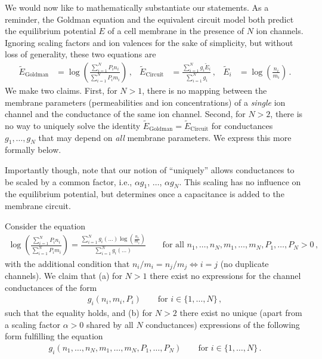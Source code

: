 We would now like to mathematically substantiate our statements.
As a reminder, the Goldman equation and the equivalent circuit model both predict the equilibrium potential $E$ of a cell membrane in the presence of $N$ ion channels.
Ignoring scaling factors and ion valences for the sake of simplicity, but without loss of generality, these two equations are
\begin{align*}
	\tilde E_\mathrm{Goldman} &= \log \left( \frac{\sum_{i=1}^N P_i n_i}{\sum_{i = 1}^N P_i m_i} \right) \,,&
	\tilde E_\mathrm{Circuit} &= \frac{\sum_{i = 1}^N g_i \tilde E_i }{\sum_{i = 1}^N g_i} \,, &
	\tilde E_i &= \log \left( \frac{n_i}{m_i} \right) \,.
\end{align*}
We make two claims. First, for $N > 1$, there is no mapping between the membrane parameters (permeabilities and ion concentrations) of a \emph{single} ion channel and the conductance of the same ion channel. Second, for $N > 2$, there is no way to uniquely solve the identity $\tilde E_\mathrm{Goldman} = \tilde E_\mathrm{Circuit}$ for conductances $g_1, \ldots, g_N$ that may depend on \emph{all} membrane parameters.
We express this more formally below.

Importantly though, note that our notion of \enquote{uniquely} allows conductances to be scaled by a common factor, i.e., $\alpha g_1$, $\ldots$, $\alpha g_N$.
This scaling has no influence on the equilibrium potential, but determines \tauMem once a capacitance is added to the membrane circuit.

\begin{proposition}
Consider the equation
\begin{align*}
	 \log \left( \frac{\sum_{i=1}^N P_i n_i}{\sum_{i = 1}^N P_i m_i} \right) = \frac{\sum_{i = 1}^N g_i(\ldots)  \log \left( \frac{n_i}{m_i} \right) }{\sum_{i = 1}^N g_i(\ldots)} \quad\quad \text{for all } n_1, \ldots, n_N, m_1, \ldots, m_N, P_1, \ldots, P_N > 0 \,,
\end{align*}
with the additional condition that $n_i / m_i = n_j / m_j \Leftrightarrow i = j$ (no duplicate channels).
We claim that (a) for $N > 1$ there exist no expressions for the channel conductances of the form
\begin{align*}
	g_i(n_i, m_i, P_i) \quad\quad \text{for } i \in \{1, \ldots, N \} \,,
\end{align*}
such that the equality holds, and (b) for $N > 2$ there exist no unique (apart from a scaling factor $\alpha > 0$ shared by all $N$ conductances) expressions of the following form fulfilling the equation
\begin{align*}
	g_i(n_1, \ldots, n_N, m_1, \ldots, m_N, P_1, \ldots, P_N) \quad\quad \text{for } i \in \{1, \ldots, N \} \,.
\end{align*}
\end{proposition}

